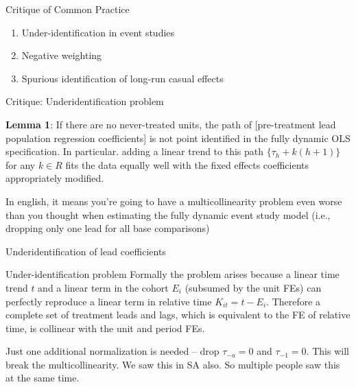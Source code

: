 \documentclass{beamer}
\begin{document}
\begin{frame}{Critique of Common Practice}

\begin{enumerate}
\item Under-identification in event studies
\item Negative weighting
\item Spurious identification of long-run casual effects
\end{enumerate}

\end{frame}

\begin{frame}{Critique: Underidentification problem}


\textbf{Lemma 1}: If there are no never-treated units, the path of [pre-treatment lead population regression coefficients] is not point identified in the fully dynamic OLS specification.  In particular. adding a linear trend to this path $\{\tau_h + k(h+1) \}$ for any $k \in R$ fits the data equally well with the fixed effects coefficients appropriately modified.

\bigskip

In english, it means you're going to have a multicollinearity problem even worse than you thought when estimating the fully dynamic event study model (i.e., dropping only one lead for all base comparisons)

\end{frame}


\begin{frame}{Underidentification of lead coefficients}

\begin{block}{Under-identification problem}
Formally the problem arises because a linear time trend $t$ and a linear term in the cohort $E_i$ (subsumed by the unit FEs) can perfectly reproduce a linear term in relative time $K_{it}=t-E_i$.  Therefore a complete set of treatment leads and lags, which is equivalent to the FE of relative time, is collinear with the unit and period FEs.
\end{block}

\bigskip

Just one additional normalization is needed -- drop $\tau_{-a}=0$ and $\tau_{-1}=0$.  This will break the multicollinearity.  We saw this in SA also.  So multiple people saw this at the same time.

\end{frame}
\end{document}
